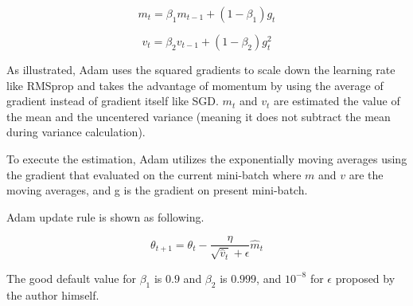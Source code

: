 	\[ m_t = \beta_1 m_{t-1} + (1 - \beta_1)g_t \]
	
	\[ v_t = \beta_2 v_{t-1} + (1 - \beta_2)g^2_t \]
	
	
	As illustrated, Adam uses the squared gradients to scale down the learning rate like RMSprop and takes the advantage of momentum by using the average of gradient instead of gradient itself like SGD. $m_t$ and $v_t$ are estimated the value of the mean and the uncentered variance (meaning it does not subtract the mean during variance calculation). 
	
	To execute the estimation, Adam utilizes the exponentially moving averages using the gradient that evaluated on the current mini-batch where $m$ and $v$ are the moving averages, and g is the gradient on present mini-batch.
	
	Adam update rule is shown as following.
	
	\[ \theta_{t+1} = \theta_t - \frac{\eta}{\sqrt{\hat{v}_t} + \epsilon} \hat{m}_t \]
	
	The good default value for $\beta_1$ is $0.9$ and $\beta_2$ is $0.999$, and $10^{-8}$ for $\epsilon$ proposed by the author himself.
	
	